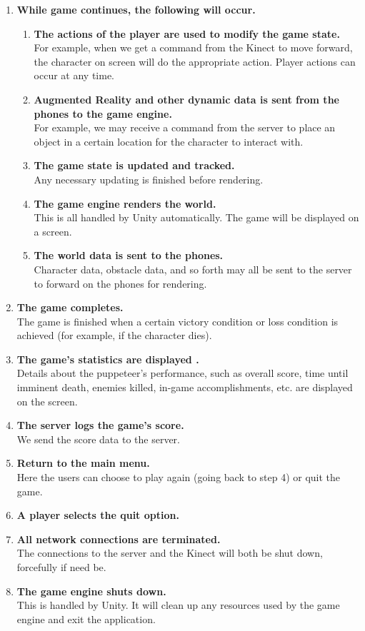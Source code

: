 \documentclass[10pt,letterpaper,oneside,english]{article}
\begin{document}
\begin{enumerate}
\item \textbf{While game continues, the following will occur.}
	\begin{enumerate}
\item \textbf{The actions of the player are used to modify the game state.} \\ For example, when we get a command from the Kinect to move forward, the character on screen will do the appropriate action. Player actions can occur at any time.
\item \textbf{Augmented Reality and other dynamic data is sent from the phones to the game engine.} \\ For example, we may receive a command from the server to place an object in a certain location for the character to interact with.
\item \textbf{The game state is updated and tracked.} \\ Any necessary updating is finished before rendering.
\item \textbf{The game engine renders the world.} \\ This is all handled by Unity automatically. The game will be displayed on a screen.
\item \textbf{The world data is sent to the phones.} \\ Character data, obstacle data, and so forth may all be sent to the server to forward on the phones for rendering.
\end{enumerate}
\item \textbf{The game completes.} \\ The game is finished when a certain victory condition or loss condition is achieved (for example, if the character dies).
\item \textbf{The game’s statistics are displayed                                                                                                                                                                                                   .} \\ Details about the puppeteer’s performance, such as overall score, time until imminent death, enemies killed, in-game accomplishments, etc. are displayed on the screen.
\item \textbf{The server logs the game’s score.} \\ We send the score data to the server.
\item \textbf{Return to the main menu.} \\ Here the users can choose to play again (going back to step 4) or quit the game.
\item \textbf{A player selects the quit option.}
\item \textbf{All network connections are terminated.} \\ The connections to the server and the Kinect will both be shut down, forcefully if need be.
\item \textbf{The game engine shuts down.} \\ This is handled by Unity. It will clean up any resources used by the game engine and exit the application.
\end{enumerate}
\end{document}
